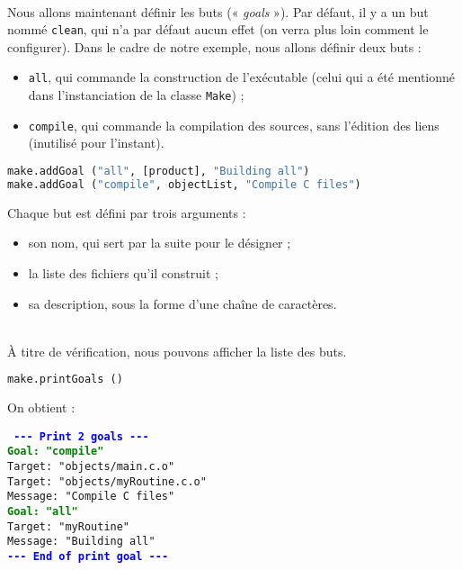 \documentclass[a4paper,11pt]{extarticle}
\begin{document}
~\\Nous allons maintenant définir les buts (« \emph{goals} »). Par défaut, il y a un but nommé \texttt{clean}, qui n'a par défaut aucun effet (on verra plus loin comment le configurer). Dans le cadre de notre exemple, nous allons définir deux buts :
\begin{itemize}
  \item \texttt{all}, qui commande la construction de l'exécutable (celui qui a été mentionné dans l'instanciation de la classe \texttt{Make}) ;
  \item \texttt{compile}, qui commande la compilation des sources, sans l'édition des liens (inutilisé pour l'instant).
\end{itemize}

\begin{lstlisting}[language=py]
make.addGoal ("all", [product], "Building all")
make.addGoal ("compile", objectList, "Compile C files")
\end{lstlisting}
Chaque but est défini par trois arguments :
\begin{itemize}
\item son nom, qui sert par la suite pour le désigner ;
\item la liste des fichiers qu'il construit ;
\item sa description, sous la forme d'une chaîne de caractères.
\end{itemize}

~\\À titre de vérification, nous pouvons afficher la liste des buts.
\begin{lstlisting}[language=py]
make.printGoals ()
\end{lstlisting}

On obtient :

\begin{mdframed}[hidealllines=true,backgroundcolor=lightgray!20]
\tt\footnotesize
\textcolor{blue}{\bf{-}{-}{-} Print 2 goals {-}{-}{-}}\\
\textcolor{green}{\bf Goal: "compile"}\\
\hspace*{1.2em}Target: "objects/main.c.o"\\
\hspace*{1.2em}Target: "objects/myRoutine.c.o"\\
\hspace*{1.2em}Message: "Compile C files"\\
\textcolor{green}{\bf Goal: "all"}\\
\hspace*{1.2em}Target: "myRoutine"\\
\hspace*{1.2em}Message: "Building all"\\
\textcolor{blue}{\bf{-}{-}{-} End of print goal {-}{-}{-}}
\end{mdframed}
\end{document}
